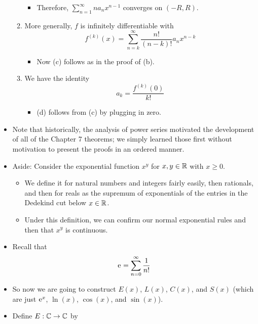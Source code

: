 \documentclass[../notes.tex]{subfiles}
\begin{document}
\begin{itemize}
\begin{enumerate}[label={(\alph*)}]
\begin{itemize}
            \item Therefore, $\sum_{n=1}^\infty na_nx^{n-1}$ converges on $(-R,R)$.
        \end{itemize}
        \item More generally, $f$ is infinitely differentiable with
        \begin{equation*}
            f^{(k)}(x) = \sum_{n=k}^\infty\frac{n!}{(n-k)!}a_nx^{n-k}
        \end{equation*}
        \begin{itemize}
            \item Now (c) follows as in the proof of (b).
        \end{itemize}
        \item We have the identity
        \begin{equation*}
            a_k = \frac{f^{(k)}(0)}{k!}
        \end{equation*}
        \begin{itemize}
            \item (d) follows from (c) by plugging in zero.
        \end{itemize}
    \end{enumerate}
    \item Note that historically, the analysis of power series motivated the development of all of the Chapter 7 theorems; we simply learned those first without motivation to present the proofs in an ordered manner.
    \item Aside: Consider the exponential function $x^y$ for $x,y\in\R$ with $x\geq 0$.
    \begin{itemize}
        \item We define it for natural numbers and integers fairly easily, then rationals, and then for reals as the supremum of exponentials of the entries in the Dedekind cut below $x\in\R$.
        \item Under this definition, we can confirm our normal exponential rules and then that $x^y$ is continuous.
    \end{itemize}
    \item Recall that
    \begin{equation*}
        \e = \sum_{n=0}^\infty\frac{1}{n!}
    \end{equation*}
    \item So now we are going to construct $E(x)$, $L(x)$, $C(x)$, and $S(x)$ (which are just $\e[x]$, $\ln(x)$, $\cos(x)$, and $\sin(x)$).
    \item Define $E:\C\to\C$ by

\end{itemize}
\end{document}
